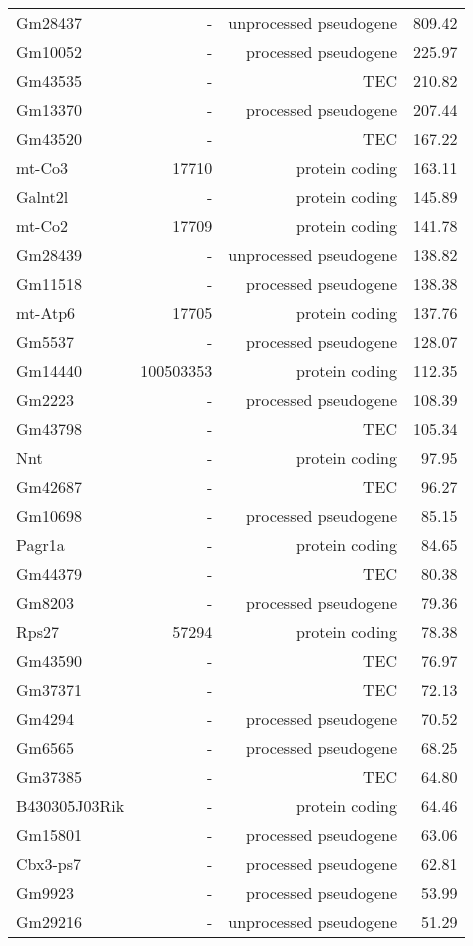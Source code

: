 \begin{longtable}[t]{lrrr}
\endfoot
\bottomrule
\endlastfoot
Gm28437 & - & unprocessed pseudogene & 809.42\\
Gm10052 & - & processed pseudogene & 225.97\\
Gm43535 & - & TEC & 210.82\\
Gm13370 & - & processed pseudogene & 207.44\\
Gm43520 & - & TEC & 167.22\\
\addlinespace
mt-Co3 & 17710 & protein coding & 163.11\\
Galnt2l & - & protein coding & 145.89\\
mt-Co2 & 17709 & protein coding & 141.78\\
Gm28439 & - & unprocessed pseudogene & 138.82\\
Gm11518 & - & processed pseudogene & 138.38\\
\addlinespace
mt-Atp6 & 17705 & protein coding & 137.76\\
Gm5537 & - & processed pseudogene & 128.07\\
Gm14440 & 100503353 & protein coding & 112.35\\
Gm2223 & - & processed pseudogene & 108.39\\
Gm43798 & - & TEC & 105.34\\
\addlinespace
Nnt & - & protein coding & 97.95\\
Gm42687 & - & TEC & 96.27\\
Gm10698 & - & processed pseudogene & 85.15\\
Pagr1a & - & protein coding & 84.65\\
Gm44379 & - & TEC & 80.38\\
\addlinespace
Gm8203 & - & processed pseudogene & 79.36\\
Rps27 & 57294 & protein coding & 78.38\\
Gm43590 & - & TEC & 76.97\\
Gm37371 & - & TEC & 72.13\\
Gm4294 & - & processed pseudogene & 70.52\\
\addlinespace
Gm6565 & - & processed pseudogene & 68.25\\
Gm37385 & - & TEC & 64.80\\
B430305J03Rik & - & protein coding & 64.46\\
Gm15801 & - & processed pseudogene & 63.06\\
Cbx3-ps7 & - & processed pseudogene & 62.81\\
\addlinespace
Gm9923 & - & processed pseudogene & 53.99\\
Gm29216 & - & unprocessed pseudogene & 51.29\\

\end{longtable}
